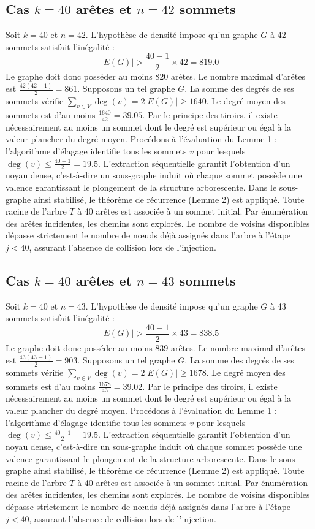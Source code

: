 \documentclass[12pt,a4paper]{article}
\begin{document}
\subsection{Cas $k = 40$ arêtes et $n = 42$ sommets}
Soit $k = 40$ et $n = 42$. L'hypothèse de densité impose qu'un graphe $G$ à 42 sommets satisfait l'inégalité :
$$ |E(G)| > \frac{40-1}{2} \times 42 = 819.0 $$
Le graphe doit donc posséder au moins $820$ arêtes. Le nombre maximal d'arêtes est $\frac{42(42-1)}{2} = 861$.
Supposons un tel graphe $G$. La somme des degrés de ses sommets vérifie $\sum_{v \in V} \deg(v) = 2|E(G)| \geq 1640$.
Le degré moyen des sommets est d'au moins $\frac{1640}{42} = 39.05$.
Par le principe des tiroirs, il existe nécessairement au moins un sommet dont le degré est supérieur ou égal à la valeur plancher du degré moyen.
Procédons à l'évaluation du Lemme 1 : l'algorithme d'élagage identifie tous les sommets $v$ pour lesquels $\deg(v) \leq \frac{40-1}{2} = 19.5$.
L'extraction séquentielle garantit l'obtention d'un noyau dense, c'est-à-dire un sous-graphe induit où chaque sommet possède une valence garantissant le plongement de la structure arborescente.
Dans le sous-graphe ainsi stabilisé, le théorème de récurrence (Lemme 2) est appliqué. Toute racine de l'arbre $T$ à 40 arêtes est associée à un sommet initial. Par énumération des arêtes incidentes, les chemins sont explorés. Le nombre de voisins disponibles dépasse strictement le nombre de nœuds déjà assignés dans l'arbre à l'étape $j < 40$, assurant l'absence de collision lors de l'injection.

\subsection{Cas $k = 40$ arêtes et $n = 43$ sommets}
Soit $k = 40$ et $n = 43$. L'hypothèse de densité impose qu'un graphe $G$ à 43 sommets satisfait l'inégalité :
$$ |E(G)| > \frac{40-1}{2} \times 43 = 838.5 $$
Le graphe doit donc posséder au moins $839$ arêtes. Le nombre maximal d'arêtes est $\frac{43(43-1)}{2} = 903$.
Supposons un tel graphe $G$. La somme des degrés de ses sommets vérifie $\sum_{v \in V} \deg(v) = 2|E(G)| \geq 1678$.
Le degré moyen des sommets est d'au moins $\frac{1678}{43} = 39.02$.
Par le principe des tiroirs, il existe nécessairement au moins un sommet dont le degré est supérieur ou égal à la valeur plancher du degré moyen.
Procédons à l'évaluation du Lemme 1 : l'algorithme d'élagage identifie tous les sommets $v$ pour lesquels $\deg(v) \leq \frac{40-1}{2} = 19.5$.
L'extraction séquentielle garantit l'obtention d'un noyau dense, c'est-à-dire un sous-graphe induit où chaque sommet possède une valence garantissant le plongement de la structure arborescente.
Dans le sous-graphe ainsi stabilisé, le théorème de récurrence (Lemme 2) est appliqué. Toute racine de l'arbre $T$ à 40 arêtes est associée à un sommet initial. Par énumération des arêtes incidentes, les chemins sont explorés. Le nombre de voisins disponibles dépasse strictement le nombre de nœuds déjà assignés dans l'arbre à l'étape $j < 40$, assurant l'absence de collision lors de l'injection.
\end{document}
